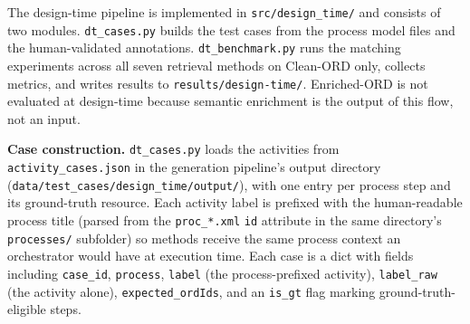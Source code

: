 The design-time pipeline is implemented in \texttt{src/design\_time/} and consists of two modules. \texttt{dt\_cases.py} builds the test cases from the process model files and the human-validated annotations. \texttt{dt\_benchmark.py} runs the matching experiments across all seven retrieval methods on Clean-ORD only, collects metrics, and writes results to \texttt{results/design-time/}. Enriched-ORD is not evaluated at design-time because semantic enrichment is the output of this flow, not an input.

\textbf{Case construction.} \texttt{dt\_cases.py} loads the activities from \texttt{activity\_cases.json} in the generation pipeline's output directory (\texttt{data/\allowbreak test\_cases/\allowbreak design\_time/\allowbreak output/}), with one entry per process step and its ground-truth resource. Each activity label is prefixed with the human-readable process title (parsed from the \texttt{proc\_*.xml} \texttt{id} attribute in the same directory's \texttt{processes/} subfolder) so methods receive the same process context an orchestrator would have at execution time. Each case is a dict with fields including \texttt{case\_id}, \texttt{process}, \texttt{label} (the process-prefixed activity), \texttt{label\_raw} (the activity alone), \texttt{expected\_ordIds}, and an \texttt{is\_gt} flag marking ground-truth-eligible steps.



